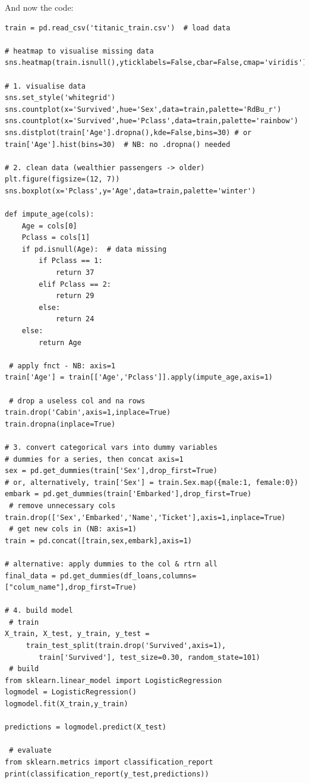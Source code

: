 \documentclass[12pt]{article}
\begin{document}
And now the code:
\begin{lstlisting}
train = pd.read_csv('titanic_train.csv')  # load data

# heatmap to visualise missing data
sns.heatmap(train.isnull(),yticklabels=False,cbar=False,cmap='viridis')

# 1. visualise data
sns.set_style('whitegrid')
sns.countplot(x='Survived',hue='Sex',data=train,palette='RdBu_r')
sns.countplot(x='Survived',hue='Pclass',data=train,palette='rainbow')
sns.distplot(train['Age'].dropna(),kde=False,bins=30) # or
train['Age'].hist(bins=30)  # NB: no .dropna() needed

# 2. clean data (wealthier passengers -> older)
plt.figure(figsize=(12, 7))
sns.boxplot(x='Pclass',y='Age',data=train,palette='winter')

def impute_age(cols):
	Age = cols[0]
	Pclass = cols[1]
	if pd.isnull(Age):  # data missing
		if Pclass == 1:
			return 37
		elif Pclass == 2:
			return 29
		else:
			return 24
	else:
		return Age

 # apply fnct - NB: axis=1
train['Age'] = train[['Age','Pclass']].apply(impute_age,axis=1)

 # drop a useless col and na rows
train.drop('Cabin',axis=1,inplace=True)
train.dropna(inplace=True)

# 3. convert categorical vars into dummy variables 
# dummies for a series, then concat axis=1
sex = pd.get_dummies(train['Sex'],drop_first=True)
# or, alternatively, train['Sex'] = train.Sex.map({male:1, female:0})
embark = pd.get_dummies(train['Embarked'],drop_first=True)
 # remove unnecessary cols
train.drop(['Sex','Embarked','Name','Ticket'],axis=1,inplace=True)
 # get new cols in (NB: axis=1)
train = pd.concat([train,sex,embark],axis=1)

# alternative: apply dummies to the col & rtrn all
final_data = pd.get_dummies(df_loans,columns=["colum_name"],drop_first=True)

# 4. build model
 # train
X_train, X_test, y_train, y_test = 
	 train_test_split(train.drop('Survived',axis=1), 
		train['Survived'], test_size=0.30, random_state=101)
 # build 		
from sklearn.linear_model import LogisticRegression
logmodel = LogisticRegression()
logmodel.fit(X_train,y_train)

predictions = logmodel.predict(X_test)

 # evaluate
from sklearn.metrics import classification_report
print(classification_report(y_test,predictions))
\end{lstlisting}
\end{document}
